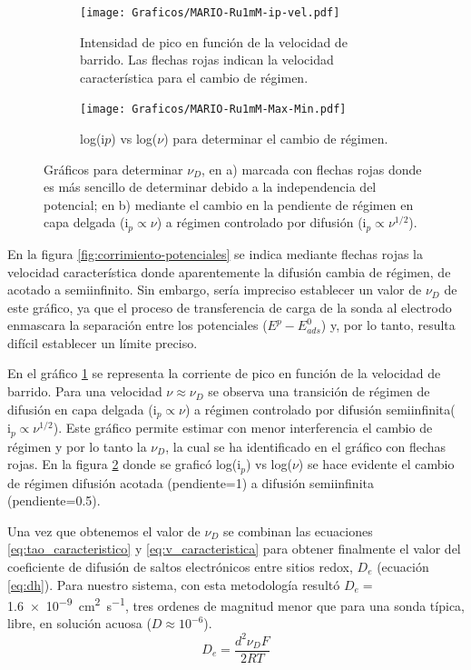          	 \begin{figure}[b!]
			 	 \begin{subfigure}[t]{0.5\textwidth}
			 	 \texttt{[image: Graficos/MARIO-Ru1mM-ip-vel.pdf]}
				  \caption{Intensidad de pico  en función de la velocidad de barrido. Las flechas rojas indican la velocidad característica para el cambio de régimen.}
			 	 \label{fig:ip-vel}
		  	  	 \end{subfigure}	
			 	 \begin{subfigure}[t]{0.5\textwidth}
			  	 \texttt{[image: Graficos/MARIO-Ru1mM-Max-Min.pdf]}
			  	 \caption{log(i$p$) vs log($\nu$) para determinar el cambio de régimen.}
			 	 \label{fig:logj-logv}
		  		 \end{subfigure}
				  \caption[Cálculo de velocidad de barrido característica]{Gráficos para determinar $\nu_{\scriptscriptstyle{D}}$, en a) marcada con flechas rojas donde es más sencillo de determinar debido a la independencia del potencial; en b) mediante el cambio en la pendiente de  régimen en capa delgada ($\text{i}_{p} \propto \nu$) a régimen controlado por difusión ($\text{i}_{p} \propto \nu^{1/2}$).}
			 	 \label{fig:ip-vel2}
			 	 \end{figure}
		   
		 En la figura \ref{fig:corrimiento-potenciales} se indica mediante flechas rojas la velocidad característica donde aparentemente la difusión cambia de régimen, de acotado a semiinfinito. Sin embargo, sería impreciso establecer un valor de $\nu_{\scriptscriptstyle{D}}$ de este gráfico, ya que el proceso de transferencia de carga de la sonda al electrodo enmascara la separación entre los potenciales ($E^p-E^0_{ads}$) y, por lo tanto, resulta difícil establecer un límite preciso.
		   	 	 
         En el gráfico \ref{fig:ip-vel} se representa la corriente de pico en función de la velocidad de barrido. Para una velocidad $\nu \approx \nu_{\scriptscriptstyle{D}}$ se observa una transición de régimen de difusión en capa delgada ($\text{i}_{p} \propto \nu$) a régimen controlado por difusión semiinfinita($\text{i}_{p} \propto \nu^{1/2}$). Este gráfico permite estimar con menor interferencia el cambio de régimen y por lo tanto la $\nu_{\scriptscriptstyle{D}}$, la cual se ha identificado en el gráfico con flechas rojas. En la figura \ref{fig:logj-logv} donde se graficó log({i$_p$}) vs log({$\nu$}) se hace evidente el cambio de régimen difusión acotada (pendiente=1) a difusión semiinfinita (pendiente=0.5).

		 Una vez que obtenemos el valor de  $\nu_{\scriptscriptstyle{D}}$ se combinan las ecuaciones \ref{eq:tao_caracteristico} y \ref{eq:v_caracteristica} para obtener finalmente el valor del coeficiente de difusión de saltos electrónicos entre sitios redox,  $D_e$ (ecuación \ref{eq:dh}). Para nuestro sistema, con esta metodología resultó $D_e=$\SI{1.6e-9}{\square\cm\per\second}, tres ordenes de magnitud menor que para una sonda típica, libre, en solución acuosa ($D\approx 10^{-6}$).  
			\begin{equation}
					D_e= \frac{d^2\nu_{\scriptscriptstyle{D}}F}{2RT}
					\label{eq:dh}
			\end{equation}
     
